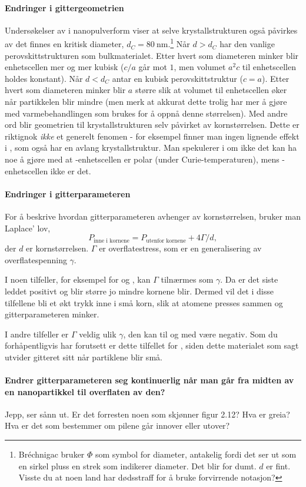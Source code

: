 
\paragraph{Endringer i gittergeometrien} Undersøkelser av  i nanopulverform viser at selve krystallstrukturen også påvirkes av det finnes en kritisk diameter, $d_C=\SI{80}{\nano\meter}$.\footnote{Bréchnigac bruker $\Phi$ som symbol for diameter, antakelig fordi det ser ut som en sirkel pluss en strek som indikerer diameter. Det blir for dumt. $d$ er fint. Visste du at noen land har dødsstraff for å bruke forvirrende notasjon?} Når $d>d_C$ har  den vanlige perovskittstrukturen som bulkmaterialet. Etter hvert som diameteren minker blir enhetscellen mer og mer kubisk ($c/a$ går mot $1$, men volumet $a^2c$ til enhetscellen holdes konstant). Når $d<d_C$ antar  en kubisk perovskittstruktur ($c=a$). Etter hvert som diameteren minker blir $a$ større slik at volumet til enhetscellen øker når partikkelen blir mindre (men merk at akkurat dette trolig har mer å gjøre med varmebehandlingen som brukes for å oppnå denne størrelsen). Med andre ord blir geometrien til krystallstrukturen selv påvirket av kornstørrelsen. Dette er riktignok \emph{ikke} et generelt fenomen - for eksempel finner man ingen lignende effekt i , som også har en avlang krystallstruktur. Man spekulerer i om ikke det kan ha noe å gjøre med at -enhetscellen er polar (under Curie-temperaturen), mens -enhetscellen ikke er det.

\paragraph{Endringer i gitterparameteren} For å beskrive hvordan gitterparameteren avhenger av kornstørrelsen, bruker man Laplace' lov,
\begin{equation}
	P_{\text{inne i kornene}}=P_{\text{utenfor kornene}}+4\Gamma/d,
\end{equation}
der $d$ er kornstørrelsen. $\Gamma$ er overflatestress, som er en generalisering av overflatespenning $\gamma$. 

I noen tilfeller, for eksempel for  og , kan $\Gamma$ tilnærmes som $\gamma$. Da er det siste leddet positivt og blir større jo mindre kornene blir. Dermed vil det i disse tilfellene bli et økt trykk inne i små korn, slik at atomene presses sammen og gitterparameteren minker.

I andre tilfeller er $\Gamma$ veldig ulik $\gamma$, den kan til og med være negativ. Som du forhåpentligvis har forutsett er dette tilfellet for , siden dette materialet som sagt utvider gitteret sitt når partiklene blir små. 

\paragraph{Endrer gitterparameteren seg kontinuerlig når man går fra midten av en nanopartikkel til overflaten av den?} Jepp, ser sånn ut. Er det forresten noen som skjønner figur 2.12? Hva er greia? Hva er det som bestemmer om pilene går innover eller utover?
